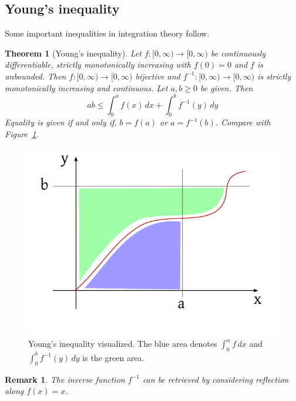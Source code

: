 \documentclass{article}
\newtheorem{theorem}{Theorem}  \numberwithin{theorem}{section}
\newtheorem{remark}{Remark}  \numberwithin{remark}{section}
\begin{document}
\subsection{Young's inequality}

Some important inequalities in integration theory follow.

\begin{theorem}[Young's inequality] %
  Let $f: [0, \infty) \to [0,\infty)$ be continuously differentiable, strictly monotonically increasing with $f(0) = 0$ and $f$ is unbounded.
  Then $f: [0, \infty) \to [0,\infty)$ bijective and $f^{-1}: [0,\infty) \to [0,\infty)$ is strictly monotonically increasing and continuous.
  Let $a, b \geq 0$ be given. Then
  \[ ab \leq \int_0^a f(x) \, dx + \int_0^b f^{-1}(y) \, dy \]
  Equality is given if and only if, $b = f(a)$ or $a = f^{-1}(b)$.
  Compare with Figure~\ref{img:young}.
\end{theorem}

\begin{figure}[t]
  \begin{center}
    \includegraphics[width=.6\textwidth]{img/23_young.pdf}
    \caption{Young's inequality visualized. The blue area denotes $\int_0^\alpha f \, dx$ and $\int_0^b f^{-1}(y) \, dy$ is the green area.}
    \label{img:young}
  \end{center}
\end{figure}

\begin{remark}
  The inverse function $f^{-1}$ can be retrieved by considering reflection along $f(x) = x$.
\end{remark}
\end{document}
